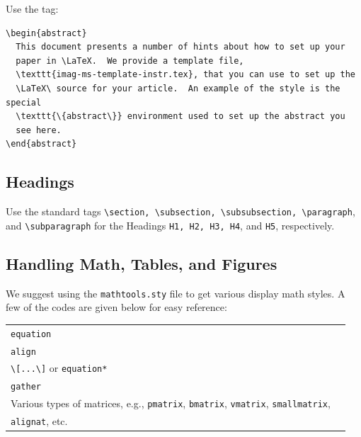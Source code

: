 \documentclass[]{imag-ms-template}
\begin{document}
Use the tag:

\begin{verbatim}
\begin{abstract}
  This document presents a number of hints about how to set up your
  paper in \LaTeX.  We provide a template file,
  \texttt{imag-ms-template-instr.tex}, that you can use to set up the
  \LaTeX\ source for your article.  An example of the style is the special
  \texttt{\{abstract\}} environment used to set up the abstract you
  see here.
\end{abstract}
\end{verbatim}

\subsection{Headings}

Use the standard tags \verb!\section, \subsection, \subsubsection, \paragraph!, and \verb!\subparagraph! for the Headings \verb!H1, H2, H3, H4!, and \verb!H5!, respectively.

\subsection{Handling Math, Tables, and Figures}

We suggest using the \verb!mathtools.sty! file to get various 
display math styles. A few of the codes are given below for easy
reference:

\bigskip

\noindent\begin{tabular}{@{}ll}
\toprule
\verb!equation!\\
\verb!align!\\
\verb!\[...\]! or \verb!equation*!\\
\verb!gather!\\
Various types of matrices, e.g., \verb!pmatrix!, \verb!bmatrix!,
\verb!vmatrix!, \verb!smallmatrix!,\\
\verb!alignat!, etc.\\
\bottomrule
\end{tabular}
\end{document}
